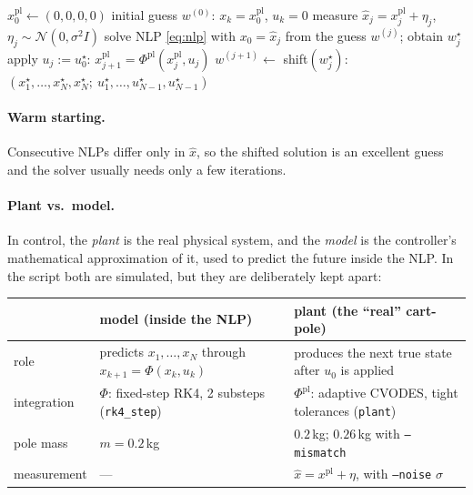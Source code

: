 \documentclass[11pt]{article}
\begin{document}
\begin{algorithm}[ht]
\caption{NMPC with shift warm start (\texttt{run\_closed\_loop})}
\begin{algorithmic}[1]
\State $x^{\mathrm{pl}}_0 \gets (0,0,0,0)$ 
\State initial guess $w^{(0)}$: $x_k=x^{\mathrm{pl}}_0$, $u_k=0$
  \State measure $\hat x_j = x^{\mathrm{pl}}_j + \eta_j$, \ $\eta_j\sim\mathcal N(0,\sigma^2 I)$ 
  \State solve NLP \eqref{eq:nlp} with $x_0=\hat x_j$ from the guess $w^{(j)}$; obtain $w^\star_j$
  \State apply $u_j := u^\star_0$: $x^{\mathrm{pl}}_{j+1} = \Phi^{\mathrm{pl}}(x^{\mathrm{pl}}_j,u_j)$ 
  \State $w^{(j+1)} \gets$ shift$(w^\star_j)$: $(x^\star_1,\dots,x^\star_N,x^\star_N;\ u^\star_1,\dots,u^\star_{N-1},u^\star_{N-1})$
\EndFor
\end{algorithmic}
\end{algorithm}

\paragraph{Warm starting.} Consecutive NLPs differ only in $\hat x$, so the shifted
solution is an excellent guess and the solver usually needs only a few iterations.

\paragraph{Plant vs.\ model.} In control, the \emph{plant} is the real physical system,
and the \emph{model} is the controller's mathematical approximation of it, used to
predict the future inside the NLP. In the script both are simulated, but they are
deliberately kept apart:

\begin{center}
\begin{tabular}{>{\raggedright\arraybackslash}p{}>{\raggedright\arraybackslash}p{}>{\raggedright\arraybackslash}p{}}
\toprule
 & \textbf{model} (inside the NLP) & \textbf{plant} (the ``real'' cart-pole) \\
\midrule
role & predicts $x_1,\dots,x_N$ through $x_{k+1}=\Phi(x_k,u_k)$
     & produces the next true state after $u_0$ is applied \\
integration & $\Phi$: fixed-step RK4, 2 substeps (\texttt{rk4\_step})
            & $\Phi^{\mathrm{pl}}$: adaptive CVODES, tight tolerances (\texttt{plant}) \\
pole mass & $m=0.2$\,kg & $0.2$\,kg; $0.26$\,kg with \texttt{--mismatch} \\
measurement & --- & $\hat x = x^{\mathrm{pl}} + \eta$, with \texttt{--noise} $\sigma$ \\
\bottomrule
\end{tabular}
\end{center}
\end{document}
